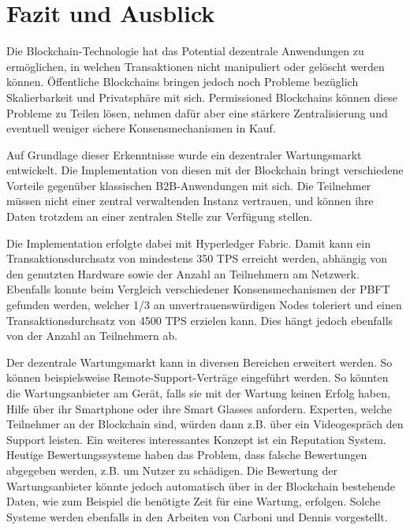 
\chapter{Fazit und Ausblick}
\label{cha:fazit}

Die Blockchain-Technologie hat das Potential dezentrale Anwendungen zu ermöglichen, in welchen Transaktionen nicht manipuliert oder gelöscht werden können. Öffentliche Blockchains bringen jedoch noch Probleme bezüglich Skalierbarkeit und Privatsphäre mit sich. Permissioned Blockchains können diese Probleme zu Teilen lösen, nehmen dafür aber eine stärkere Zentralisierung und eventuell weniger sichere Konsensmechanismen in Kauf. 

Auf Grundlage dieser Erkenntnisse wurde ein dezentraler Wartungsmarkt entwickelt. Die Implementation von diesen mit der Blockchain bringt verschiedene Vorteile gegenüber klassischen B2B-Anwendungen mit sich. Die Teilnehmer müssen nicht einer zentral verwaltenden Instanz vertrauen, und können ihre Daten trotzdem an einer zentralen Stelle zur Verfügung stellen.

Die Implementation erfolgte dabei mit Hyperledger Fabric. Damit kann ein Transaktionsdurchsatz von mindestens 350 TPS erreicht werden, abhängig von den genutzten Hardware sowie der Anzahl an Teilnehmern am Netzwerk. Ebenfalls konnte beim Vergleich verschiedener Konsensmechanismen der PBFT gefunden werden, welcher 1/3 an unvertrauenswürdigen Nodes toleriert und einen Transaktionsdurchsatz von 4500 TPS erzielen kann. Dies hängt jedoch ebenfalls von der Anzahl an Teilnehmern ab.

Der dezentrale Wartungsmarkt kann in diversen Bereichen erweitert werden. So können beispielsweise Remote-Support-Verträge eingeführt werden. So könnten die Wartungsanbieter am Gerät, falls sie mit der Wartung keinen Erfolg haben, Hilfe über ihr Smartphone oder ihre Smart Glasses anfordern. Experten, welche Teilnehmer an der Blockchain sind, würden dann z.B. über ein Videogespräch den Support leisten. Ein weiteres interessantes Konzept ist ein Reputation System. Heutige Bewertungssysteme haben das Problem, dass falsche Bewertungen abgegeben werden, z.B. um Nutzer zu schädigen. Die Bewertung der Wartungsanbieter könnte jedoch automatisch über in der Blockchain bestehende Daten, wie zum Beispiel die benötigte Zeit für eine Wartung, erfolgen. Solche Systeme werden ebenfalls in den Arbeiten von Carboni \cite{CarboniFeedbackbasedReputation2015} und Dennis \cite{DennisRepblocknext2015} vorgestellt.

